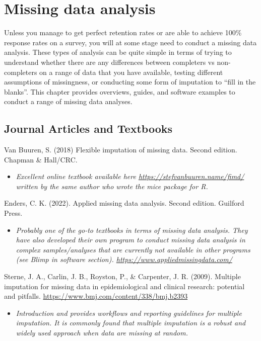 \documentclass[
]{book}
\providecommand{\tightlist}{%
  \setlength{\itemsep}{0pt}\setlength{\parskip}{0pt}}
\begin{document}
\chapter{Missing data analysis}\label{missing-data-analysis}

Unless you manage to get perfect retention rates or are able to achieve 100\% response rates on a survey, you will at some stage need to conduct a missing data analysis. These types of analysis can be quite simple in terms of trying to understand whether there are any differences between completers vs non-completers on a range of data that you have available, testing different assumptions of missingness, or conducting some form of imputation to ``fill in the blanks''. This chapter provides overviews, guides, and software examples to conduct a range of missing data analyses.

\section{Journal Articles and Textbooks}\label{journal-articles-and-textbooks-5}

Van Buuren, S. (2018) Flexible imputation of missing data. Second edition. Chapman \& Hall/CRC.

\begin{itemize}
\tightlist
\item
  \emph{Excellent online textbook available here \url{https://stefvanbuuren.name/fimd/} written by the same author who wrote the mice package for R. }
\end{itemize}

Enders, C. K. (2022). Applied missing data analysis. Second edition. Guilford Press.

\begin{itemize}
\tightlist
\item
  \emph{Probably one of the go-to textbooks in terms of missing data analysis. They have also developed their own program to conduct missing data analysis in complex samples/analyses that are currently not available in other programs (see Blimp in software section). \url{https://www.appliedmissingdata.com/} }
\end{itemize}

Sterne, J. A., Carlin, J. B., Royston, P., \& Carpenter, J. R. (2009). Multiple imputation for missing data in epidemiological and clinical research: potential and pitfalls. \url{https://www.bmj.com/content/338/bmj.b2393}

\begin{itemize}
\tightlist
\item
  \emph{Introduction and provides workflows and reporting guidelines for multiple imputation. It is commonly found that multiple imputation is a robust and widely used approach when data are missing at random.}
\end{itemize}
\end{document}
